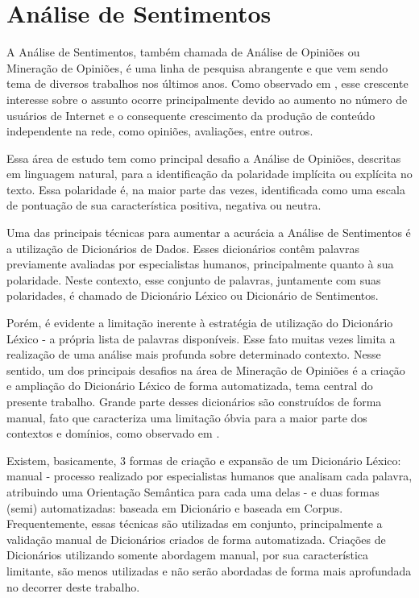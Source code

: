 \documentclass[12pt]{article}
\begin{document}
\section{Análise de Sentimentos}
A Análise de Sentimentos, também chamada de Análise de Opiniões ou Mineração de Opiniões, é uma linha de pesquisa abrangente e que vem sendo tema de diversos trabalhos nos últimos anos. Como observado em \cite{liu2010multifaceted}, esse crescente interesse sobre o assunto ocorre principalmente devido ao aumento no número de usuários de Internet e o consequente crescimento da produção de conteúdo independente na rede, como opiniões, avaliações, entre outros. 

Essa área de estudo tem como principal desafio a Análise de Opiniões, descritas em linguagem natural, para a identificação da polaridade implícita ou explícita no texto. Essa polaridade é, na maior parte das vezes, identificada como uma escala de pontuação de sua característica positiva, negativa ou neutra.

Uma das principais técnicas para aumentar a acurácia a Análise de Sentimentos é a utilização de Dicionários de Dados. Esses dicionários contêm palavras previamente avaliadas por especialistas humanos, principalmente quanto à sua polaridade. Neste contexto, esse conjunto de palavras, juntamente com suas polaridades, é chamado de Dicionário Léxico ou Dicionário de Sentimentos. 

Porém, é evidente a limitação inerente à estratégia de utilização do Dicionário Léxico - a própria lista de palavras disponíveis. Esse fato muitas vezes limita a realização de uma análise mais profunda sobre determinado contexto. Nesse sentido, um dos principais desafios na área de Mineração de Opiniões é a criação e ampliação do Dicionário Léxico de forma automatizada, tema central do presente trabalho. Grande parte desses dicionários são construídos de forma manual, fato que caracteriza uma limitação óbvia para a maior parte dos contextos e domínios, como observado em \cite{duwairi2015detecting}. 

Existem, basicamente, 3 formas de criação e expansão de um Dicionário Léxico: manual -  processo realizado por especialistas humanos que analisam cada palavra, atribuindo uma Orientação Semântica para cada uma delas -  e duas formas (semi) automatizadas: baseada em Dicionário e baseada em Corpus. Frequentemente, essas técnicas são utilizadas em conjunto, principalmente a validação manual de Dicionários criados de forma automatizada. Criações de Dicionários utilizando somente abordagem manual, por sua característica limitante, são menos utilizadas e não serão abordadas de forma mais aprofundada no decorrer deste trabalho.
\end{document}
